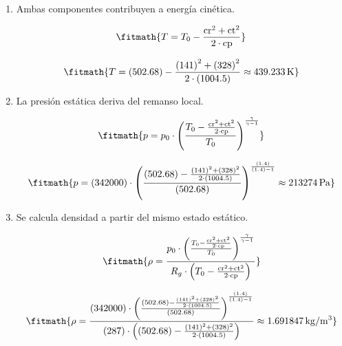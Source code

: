 \begin{enumerate}

\item Ambas componentes contribuyen a energía cinética.

\[\fitmath{T=T_0-\frac{{\mathrm{cr}}^{2}+{\mathrm{ct}}^{2}}{2\cdot \mathrm{cp}}}\]

\[\fitmath{T=(502.68)-\frac{{(141)}^{2}+{(328)}^{2}}{2\cdot (1004.5)}\approx 439.233\,\mathrm{K}}\]

\item La presión estática deriva del remanso local.

\[\fitmath{p=p_0\cdot {\left(\frac{T_0-\frac{{\mathrm{cr}}^{2}+{\mathrm{ct}}^{2}}{2\cdot \mathrm{cp}}}{T_0}\right)}^{\frac{\gamma}{\gamma-1}}}\]

\[\fitmath{p=(342000)\cdot {\left(\frac{(502.68)-\frac{{(141)}^{2}+{(328)}^{2}}{2\cdot (1004.5)}}{(502.68)}\right)}^{\frac{(1.4)}{(1.4)-1}}\approx 213274\,\mathrm{Pa}}\]

\item Se calcula densidad a partir del mismo estado estático.

\[\fitmath{\rho=\frac{p_0\cdot {\left(\frac{T_0-\frac{{\mathrm{cr}}^{2}+{\mathrm{ct}}^{2}}{2\cdot \mathrm{cp}}}{T_0}\right)}^{\frac{\gamma}{\gamma-1}}}{R_g\cdot \left(T_0-\frac{{\mathrm{cr}}^{2}+{\mathrm{ct}}^{2}}{2\cdot \mathrm{cp}}\right)}}\]

\[\fitmath{\rho=\frac{(342000)\cdot {\left(\frac{(502.68)-\frac{{(141)}^{2}+{(328)}^{2}}{2\cdot (1004.5)}}{(502.68)}\right)}^{\frac{(1.4)}{(1.4)-1}}}{(287)\cdot \left((502.68)-\frac{{(141)}^{2}+{(328)}^{2}}{2\cdot (1004.5)}\right)}\approx 1.691847\,\mathrm{kg/m^{3}}}\]

\end{enumerate}
